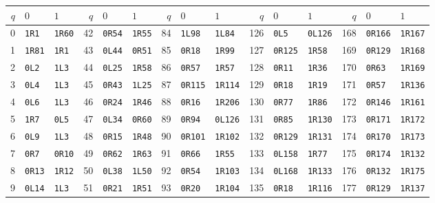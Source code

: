 \begin{center}
\scriptsize
\setlength{\tabcolsep}{4pt}
\begin{tabular}{rll@{\qquad}rll@{\qquad}rll@{\qquad}rll@{\qquad}rll}
\toprule
$q$ & $0$ & $1$ & $q$ & $0$ & $1$ & $q$ & $0$ & $1$ & $q$ & $0$ & $1$ & $q$ & $0$ & $1$ \\
\midrule
0 & \texttt{1R1} & \texttt{1R60} & 42 & \texttt{0R54} & \texttt{1R55} & 84 & \texttt{1L98} & \texttt{1L84} & 126 & \texttt{0L5} & \texttt{0L126} & 168 & \texttt{0R166} & \texttt{1R167} \\
1 & \texttt{1R81} & \texttt{1R1} & 43 & \texttt{0L44} & \texttt{0R51} & 85 & \texttt{0R18} & \texttt{1R99} & 127 & \texttt{0R125} & \texttt{1R58} & 169 & \texttt{0R129} & \texttt{1R168} \\
2 & \texttt{0L2} & \texttt{1L3} & 44 & \texttt{0L25} & \texttt{1R58} & 86 & \texttt{0R57} & \texttt{1R57} & 128 & \texttt{0R11} & \texttt{1R36} & 170 & \texttt{0R63} & \texttt{1R169} \\
3 & \texttt{0L4} & \texttt{1L3} & 45 & \texttt{0R43} & \texttt{1L25} & 87 & \texttt{0R115} & \texttt{1R114} & 129 & \texttt{0R18} & \texttt{1R19} & 171 & \texttt{0R57} & \texttt{1R136} \\
4 & \texttt{0L6} & \texttt{1L3} & 46 & \texttt{0R24} & \texttt{1R46} & 88 & \texttt{0R16} & \texttt{1R206} & 130 & \texttt{0R77} & \texttt{1R86} & 172 & \texttt{0R146} & \texttt{1R161} \\
5 & \texttt{1R7} & \texttt{0L5} & 47 & \texttt{0L34} & \texttt{0R60} & 89 & \texttt{0R94} & \texttt{0L126} & 131 & \texttt{0R85} & \texttt{1R130} & 173 & \texttt{0R171} & \texttt{1R172} \\
6 & \texttt{0L9} & \texttt{1L3} & 48 & \texttt{0R15} & \texttt{1R48} & 90 & \texttt{0R101} & \texttt{1R102} & 132 & \texttt{0R129} & \texttt{1R131} & 174 & \texttt{0R170} & \texttt{1R173} \\
7 & \texttt{0R7} & \texttt{0R10} & 49 & \texttt{0R62} & \texttt{1R63} & 91 & \texttt{0R66} & \texttt{1R55} & 133 & \texttt{0L158} & \texttt{1R77} & 175 & \texttt{0R174} & \texttt{1R132} \\
8 & \texttt{0R13} & \texttt{1R12} & 50 & \texttt{0L38} & \texttt{1L50} & 92 & \texttt{0R54} & \texttt{1R103} & 134 & \texttt{0L168} & \texttt{1R133} & 176 & \texttt{0R132} & \texttt{1R175} \\
9 & \texttt{0L14} & \texttt{1L3} & 51 & \texttt{0R21} & \texttt{1R51} & 93 & \texttt{0R20} & \texttt{1R104} & 135 & \texttt{0R18} & \texttt{1R116} & 177 & \texttt{0R129} & \texttt{1R137} \\

\end{tabular}
\end{center}
